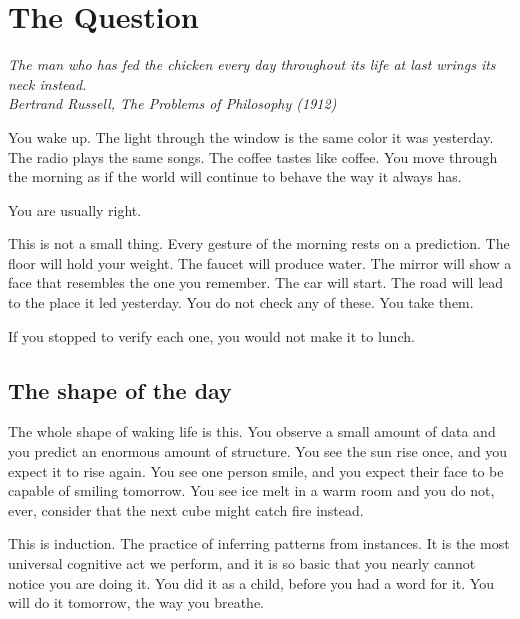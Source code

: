 \chapter{The Question}

\vspace{1em}
\hfill
\begin{minipage}[c]{0.55\textwidth}
\raggedleft
\small\itshape
The man who has fed the chicken every day throughout its life at last wrings its neck instead.\\[0.5em]
\upshape\footnotesize Bertrand Russell, \textit{The Problems of Philosophy} (1912)
\end{minipage}%
\hspace{0.5em}
\begin{minipage}[c]{0.12\textwidth}
\end{minipage}
\vspace{1.5em}

\noindent You wake up. The light through the window is the same color it was yesterday. The radio plays the same songs. The coffee tastes like coffee. You move through the morning as if the world will continue to behave the way it always has.

You are usually right.

This is not a small thing. Every gesture of the morning rests on a prediction. The floor will hold your weight. The faucet will produce water. The mirror will show a face that resembles the one you remember. The car will start. The road will lead to the place it led yesterday. You do not check any of these. You take them.

If you stopped to verify each one, you would not make it to lunch.

\section*{The shape of the day}

The whole shape of waking life is this. You observe a small amount of data and you predict an enormous amount of structure. You see the sun rise once, and you expect it to rise again. You see one person smile, and you expect their face to be capable of smiling tomorrow. You see ice melt in a warm room and you do not, ever, consider that the next cube might catch fire instead.

This is induction. The practice of inferring patterns from instances. It is the most universal cognitive act we perform, and it is so basic that you nearly cannot notice you are doing it. You did it as a child, before you had a word for it. You will do it tomorrow, the way you breathe.

